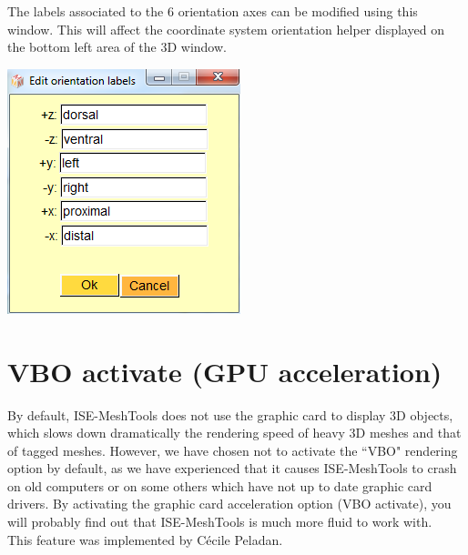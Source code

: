 \noindent
\begin{minipage}{0.55\textwidth}
The labels associated to the 6 orientation axes can be modified using this window. This will affect the coordinate system orientation helper displayed on the bottom left area of the 3D
window.

\end{minipage}  
 \begin{minipage}{0.45\textwidth}\centering
\includegraphics[scale=0.5]{images/Viewing_options/Object_labels.png}

 \end{minipage} 
\noindent



\section{VBO activate (GPU acceleration)}
By default, ISE-MeshTools does not use the graphic card to display 3D objects, which slows down dramatically the rendering speed of heavy 3D meshes and that of tagged meshes. However, we have chosen not to activate the ``VBO" rendering option by default, as we have experienced that it causes ISE-MeshTools to crash on old computers or on some others which have not up to date graphic card drivers. By activating the graphic card acceleration option (VBO activate), you will probably find out that ISE-MeshTools is much more fluid to work with.\\ This feature was implemented by Cécile Peladan.

